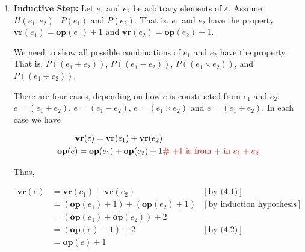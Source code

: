 \documentclass[12pt]{article}
\begin{document}
\begin{itemize}
\begin{itemize}
\begin{enumerate}[1.]
            \item \textbf{Inductive Step:} Let $e_1$ and $e_2$ be arbitrary elements of $\varepsilon$.
            Assume $H({e_1,e_2}):$ $P(e_1)$ and $P(e_2)$. That is, $e_1$ and $e_2$
            have the property $\textbf{vr}(e_1) = \textbf{op}(e_1) + 1$ and
            $\textbf{vr}(e_2) = \textbf{op}(e_2) + 1$.

            \bigskip

            We need to show all possible combinations of $e_1$ and $e_2$ have the
            property. That is, $P((e_1 + e_2))$, $P((e_1 - e_2))$, $P((e_1 \times e_2))$,
            and $P((e_1 \div e_2))$.

            \begin{mdframed}

            There are four cases, depending on how $e$ is constructed from $e_1$ and $e_2$:
            $e = (e_1 + e_2)$, $e = (e_1 - e_2)$, $e = (e_1 \times e_2)$ and $e = (e_1 \div e_2)$.
            In each case we have

            \begin{align}
                \textbf{vr}(e) = \textbf{vr}(e_1) + \textbf{vr}(e_2) & \\
                \textbf{op}(e) = \textbf{op}(e_1) + \textbf{op}(e_2) + 1 & \color{red}\text{\# +1 is from + in $e_1 + e_2$}
            \end{align}

            \bigskip

            Thus,

            \begin{align}
                \textbf{vr}(e) &= \textbf{vr}(e_1) + \textbf{vr}(e_2) & [\text{by (4.1)}]\\
                &= (\textbf{op}(e_1) + 1) + (\textbf{op}(e_2) + 1) & [\text{by induction hypothesis}]\\
                &= (\textbf{op}(e_1) + \textbf{op}(e_2)) + 2\\
                &= (\textbf{op}(e) - 1) + 2 & [\text{by (4.2)}]\\
                &= \textbf{op}(e) + 1
            \end{align}

            \end{mdframed}
        \end{enumerate}
    \end{itemize}
\end{itemize}

\end{document}
